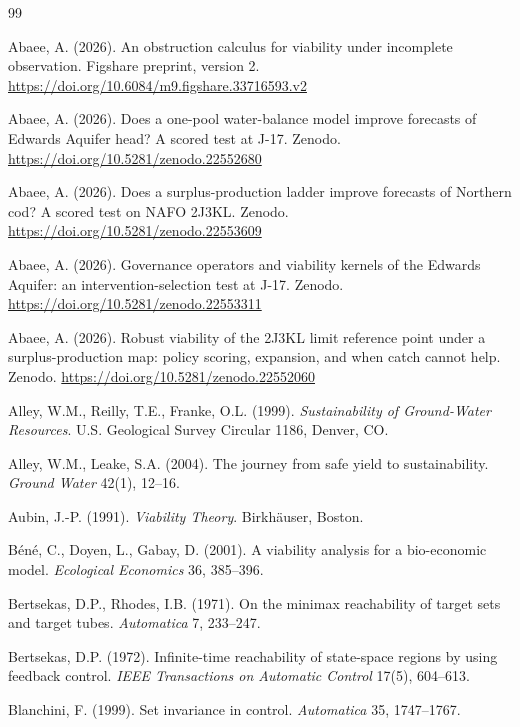 \begin{thebibliography}{99}\footnotesize

 Abaee, A. (2026). An obstruction calculus for viability under incomplete observation. Figshare preprint, version 2. \url{https://doi.org/10.6084/m9.figshare.33716593.v2}

 Abaee, A. (2026). Does a one-pool water-balance model improve forecasts of Edwards Aquifer head? A scored test at J-17. Zenodo. \url{https://doi.org/10.5281/zenodo.22552680}

 Abaee, A. (2026). Does a surplus-production ladder improve forecasts of Northern cod? A scored test on NAFO 2J3KL. Zenodo. \url{https://doi.org/10.5281/zenodo.22553609}

 Abaee, A. (2026). Governance operators and viability kernels of the Edwards Aquifer: an intervention-selection test at J-17. Zenodo. \url{https://doi.org/10.5281/zenodo.22553311}

 Abaee, A. (2026). Robust viability of the 2J3KL limit reference point under a surplus-production map: policy scoring, expansion, and when catch cannot help. Zenodo. \url{https://doi.org/10.5281/zenodo.22552060}

 Alley, W.M., Reilly, T.E., Franke, O.L. (1999). \emph{Sustainability of Ground-Water Resources}. U.S. Geological Survey Circular 1186, Denver, CO.

 Alley, W.M., Leake, S.A. (2004). The journey from safe yield to sustainability. \emph{Ground Water} 42(1), 12--16.

 Aubin, J.-P. (1991). \emph{Viability Theory}. Birkh\"auser, Boston.

 B\'en\'e, C., Doyen, L., Gabay, D. (2001). A viability analysis for a bio-economic model. \emph{Ecological Economics} 36, 385--396.

 Bertsekas, D.P., Rhodes, I.B. (1971). On the minimax reachability of target sets and target tubes. \emph{Automatica} 7, 233--247.

 Bertsekas, D.P. (1972). Infinite-time reachability of state-space regions by using feedback control. \emph{IEEE Transactions on Automatic Control} 17(5), 604--613.

 Blanchini, F. (1999). Set invariance in control. \emph{Automatica} 35, 1747--1767.


\end{thebibliography}
